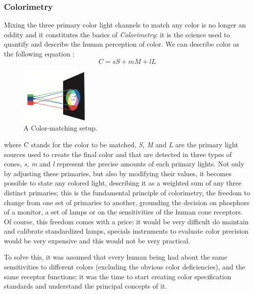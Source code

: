 \subsubsection{Colorimetry}
Mixing the three primary color light channels to match any color is no longer an oddity and it constitutes
the basics of \emph{Colorimetry}: it is the science used to quantify and describe the human perception of color.
We can describe color as the following equation \cite{Ware2012}:
\begin{equation}
C = sS + mM + lL
\end{equation}
%
\begin{figure}
	\centering
    \includegraphics[width=0.3\textwidth]{images/background/Trichromacy.png}
	\caption[Trichromacy Theory]{A Color-matching setup. \cite{Ware2012}}
\end{figure}
%
where C stands for the color to be matched, \emph{S, M} and \emph{L} are the primary light sources used to create the final
color and that are detected in three types of cones, \emph{s, m} and \emph{l} represent the precise amounts of each primary
lights. Not only by adjusting these primaries, but also by modifying their values, it becomes possible to
state any colored light, describing it as a weighted
sum of any three distinct primaries; this is the fundamental principle of colorimetry, the freedom to change from
one set of primaries to another, grounding the decision on phosphors of a monitor, a set of lamps or on the
sensitivities of the human cone receptors. Of course, this freedom comes with a price: it would be very difficult
do maintain and calibrate standardized lamps, specials instruments to evaluate color precision would be very
expensive and this would not be very practical. \par
To solve this, it was assumed that every human being had about the
same sensitivities to different colors (excluding the obvious color deficiencies), and the same receptor functions;
it was the time to start creating color specification standards and understand the principal concepts of it.
%
